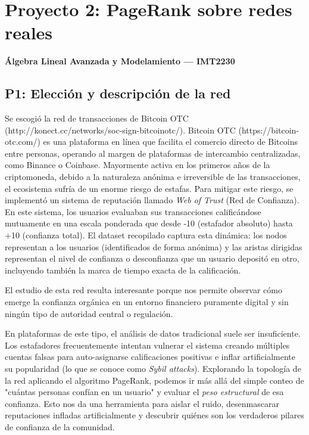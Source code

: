 \documentclass{article}
\begin{document}
\section*{Proyecto 2: PageRank sobre redes reales}
\textbf{Álgebra Lineal Avanzada y Modelamiento — IMT2230}



\subsection*{P1: Elección y descripción de la red}




Se escogió la red de transacciones de Bitcoin OTC (http://konect.cc/networks/soc-sign-bitcoinotc/).    
Bitcoin OTC (https://bitcoin-otc.com/) es una plataforma en línea que facilita el comercio directo de Bitcoins entre personas, operando al margen de plataformas de intercambio centralizadas, como Binance o Coinbase.
Mayormente activa en los primeros años de la criptomoneda, debido a la naturaleza anónima e irreversible de las transacciones, el ecosistema sufría de un enorme riesgo de estafas. Para mitigar este riesgo, se implementó un sistema de reputación llamado \textit{Web of Trust} (Red de Confianza). En este sistema, los usuarios evaluaban sus transacciones calificándose mutuamente en una escala ponderada que desde -10 (estafador absoluto) hasta +10 (confianza total). El dataset recopilado captura esta dinámica: los nodos representan a los usuarios (identificados de forma anónima) y las aristas dirigidas representan el nivel de confianza o desconfianza que un usuario depositó en otro, incluyendo también la marca de tiempo exacta de la calificación.  

El estudio de esta red resulta interesante porque nos permite observar cómo emerge la confianza orgánica en un entorno financiero puramente digital y sin ningún tipo de autoridad central o regulación. 

En plataformas de este tipo, el análisis de datos tradicional suele ser insuficiente. Los estafadores frecuentemente intentan vulnerar el sistema creando múltiples cuentas falsas para auto-asignarse calificaciones positivas e inflar artificialmente su popularidad (lo que se conoce como \textit{Sybil attacks}). Explorando la topología de la red aplicando el algoritmo PageRank, podemos ir más allá del simple conteo de "cuántas personas confían en un usuario" y evaluar el \textit{peso estructural} de esa confianza. Esto nos da una herramienta para aislar el ruido, desenmascarar reputaciones infladas artificialmente y descubrir quiénes son los verdaderos pilares de confianza de la comunidad.
\end{document}
